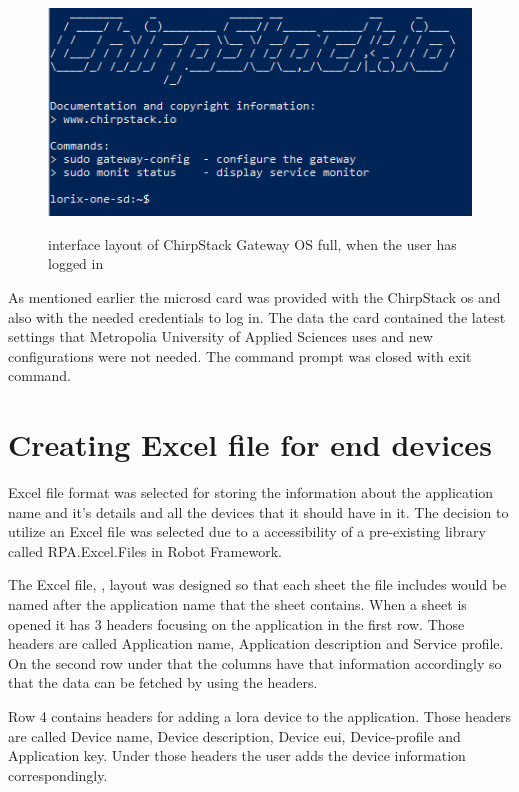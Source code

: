 \begin{figure}[ht]
  \centering
  {\includegraphics[width=\textwidth]{illustration/chirpstack_io_main_screen.PNG}}
  \caption{interface layout of ChirpStack Gateway OS full, when the user has logged in}
  \label{fig:ChirpStack_gateway_os}
\end{figure}

As mentioned earlier the micro\gls{sd} card was provided with the ChirpStack \gls{os} and also with the needed credentials to log in.
The data the card contained the latest settings that Metropolia University of Applied Sciences uses and new configurations were not needed.
The command prompt was closed with exit command.

\section{Creating Excel file for end devices}
Excel file format was selected for storing the information about the application name and it's details and all the devices that it should have in it.
The decision to utilize an Excel file was selected due to a accessibility of a pre-existing library called RPA.Excel.Files in Robot Framework.

\clearpage

The Excel file, , layout was designed so that each sheet the file includes would be named after the application name that the sheet contains.
When a sheet is opened it has 3 headers focusing on the application in the first row.
Those headers are called Application name, Application description and Service profile.
On the second row under that the columns have that information accordingly so that the data can be fetched by using the headers.

Row 4 contains headers for adding a \gls{lora} device to the application.
Those headers are called Device name, Device description, Device \gls{eui}, Device-profile and Application key.
Under those headers the user adds the device information correspondingly.

